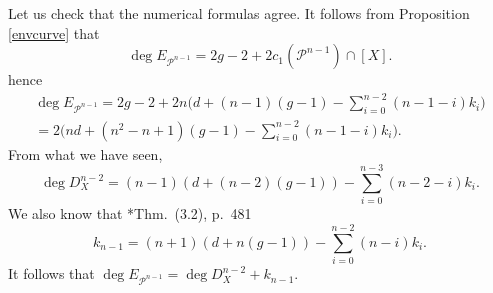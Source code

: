 \documentclass[reqno]{amsart}
\theoremstyle{definition}
\theoremstyle{remark}
\begin{document}
Let us check that the numerical formulas agree.
It follows from Proposition \ref{envcurve} that
\[\deg E_{\mathcal P^{n-1}}=2g-2+2c_1(\mathcal P^{n-1})\cap [X].\]
hence
\begin{multline*}\textstyle \deg E_{\mathcal P^{n-1}}= 2g-2+2n\bigl(d+(n-1)(g-1)-\sum_{i=0}^{n-2} (n-1-i)k_i\bigr)\\
\textstyle =2\bigl(nd+(n^2-n+1)(g-1)-\sum_{i=0}^{n-2} (n-1-i)k_i\bigr).
\end{multline*}
From what we have seen,
\[\textstyle
\deg D_X^{n-2}= (n-1)(d+(n-2)(g-1))-\sum_{i=0}^{n-3}(n-2-i)k_i.\]
We also know that \cite{numchar}*{Thm.~(3.2), p.~481}
\[ \textstyle k_{n-1}= (n+1)(d+n(g-1))-\sum_{i=0}^{n-2}(n-i)k_i.
\]
It follows that $\deg E_{\mathcal P^{n-1}}=\deg D_X^{n-2}+k_{n-1}$.

\bigskip
\bigskip

\bigskip
\end{document}
